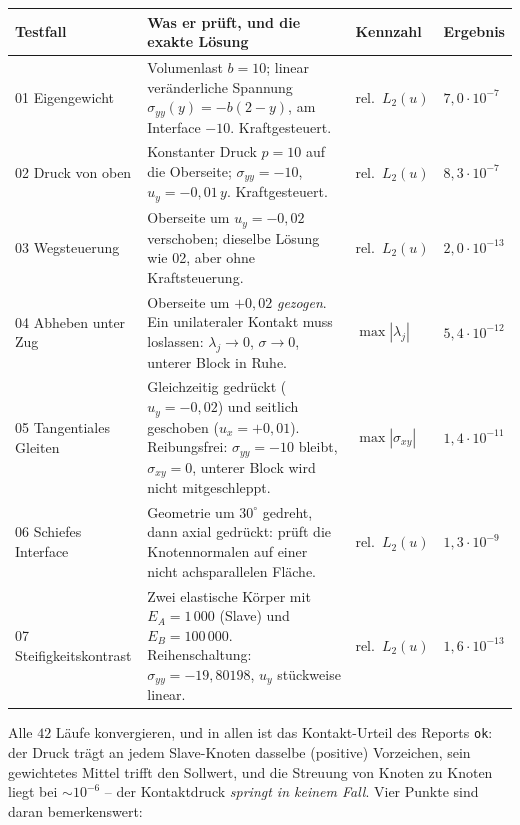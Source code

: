\documentclass[a4paper,11pt]{article}
\def\bm#1{#1}%
\newcommand{\code}[1]{\texttt{\small #1}}
\begin{document}
\begin{center}
\small
\begin{tabularx}{\linewidth}{@{}lXll@{}}
\toprule
Testfall & Was er prüft, und die exakte Lösung & Kennzahl & Ergebnis \\
\midrule
01 Eigengewicht &
Volumenlast $b=10$; linear veränderliche Spannung $\sigma_{yy}(y)=-b(2-y)$, am Interface $-10$.
Kraftgesteuert. & rel.\ $L_2(\bm u)$ & $7{,}0\cdot10^{-7}$ \\[2pt]
02 Druck von oben &
Konstanter Druck $p=10$ auf die Oberseite; $\sigma_{yy}=-10$, $u_y=-0{,}01\,y$. Kraftgesteuert.
& rel.\ $L_2(\bm u)$ & $8{,}3\cdot10^{-7}$ \\[2pt]
03 Wegsteuerung &
Oberseite um $u_y=-0{,}02$ verschoben; dieselbe Lösung wie 02, aber ohne Kraftsteuerung.
& rel.\ $L_2(\bm u)$ & $2{,}0\cdot10^{-13}$ \\[2pt]
04 Abheben unter Zug &
Oberseite um $+0{,}02$ \emph{gezogen}. Ein unilateraler Kontakt muss loslassen:
$\lambda_j\to0$, $\sigma\to0$, unterer Block in Ruhe. & $\max|\lambda_j|$ & $5{,}4\cdot10^{-12}$ \\[2pt]
05 Tangentiales Gleiten &
Gleichzeitig gedrückt ($u_y=-0{,}02$) und seitlich geschoben ($u_x=+0{,}01$). Reibungsfrei:
$\sigma_{yy}=-10$ bleibt, $\sigma_{xy}=0$, unterer Block wird nicht mitgeschleppt.
& $\max|\sigma_{xy}|$ & $1{,}4\cdot10^{-11}$ \\[2pt]
06 Schiefes Interface &
Geometrie um $30^\circ$ gedreht, dann axial gedrückt: prüft die Knotennormalen auf einer nicht
achsparallelen Fläche. & rel.\ $L_2(\bm u)$ & $1{,}3\cdot10^{-9}$ \\[2pt]
07 Steifigkeitskontrast &
Zwei elastische Körper mit $E_A=1\,000$ (Slave) und $E_B=100\,000$. Reihenschaltung:
$\sigma_{yy}=-19{,}80198$, $u_y$ stückweise linear. & rel.\ $L_2(\bm u)$ & $1{,}6\cdot10^{-13}$ \\
\bottomrule
\end{tabularx}
\end{center}

\noindent Alle $42$ Läufe konvergieren, und in allen ist das Kontakt-Urteil des Reports
\code{ok}: der Druck trägt an jedem Slave-Knoten dasselbe (positive) Vorzeichen, sein
gewichtetes Mittel trifft den Sollwert, und die Streuung von Knoten zu Knoten liegt bei
$\sim\!10^{-6}$ -- der Kontaktdruck \emph{springt in keinem Fall}. Vier Punkte sind daran
bemerkenswert:
\end{document}
